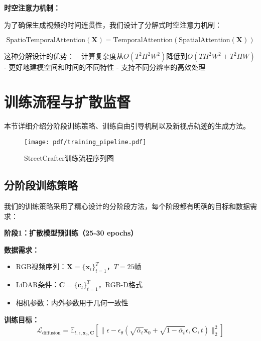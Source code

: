 \textbf{时空注意力机制：}

为了确保生成视频的时间连贯性，我们设计了分解式时空注意力机制：

\begin{equation}
\text{SpatioTemporalAttention}(\mathbf{X}) = \text{TemporalAttention}(\text{SpatialAttention}(\mathbf{X}))
\label{eq:factorized_attention}
\end{equation}

这种分解设计的优势：
- 计算复杂度从$O(T^2H^2W^2)$降低到$O(TH^2W^2 + T^2HW)$
- 更好地建模空间和时间的不同特性
- 支持不同分辨率的高效处理

\section{训练流程与扩散监督}

本节详细介绍分阶段训练策略、训练自由引导机制以及新视点轨迹的生成方法。

\begin{figure}[htbp]
  \centering
  \texttt{[image: pdf/training\_pipeline.pdf]}
  \caption{StreetCrafter训练流程序列图}
  \label{fig:training-pipeline}
\end{figure}

\subsection{分阶段训练策略}

我们的训练策略采用了精心设计的分阶段方法，每个阶段都有明确的目标和数据需求：

\textbf{阶段1：扩散模型预训练（25-30 epochs）}

\textbf{数据需求：}
\begin{itemize}
\item RGB视频序列：$\mathbf{X} = \{\mathbf{x}_t\}_{t=1}^{T}$，$T=25$帧
\item LiDAR条件：$\mathbf{C} = \{\mathbf{c}_t\}_{t=1}^{T}$，RGB-D格式
\item 相机参数：内外参数用于几何一致性
\end{itemize}

\textbf{训练目标：}
\begin{equation}
\mathcal{L}_{\text{diffusion}} = \mathbb{E}_{t,\epsilon,\mathbf{x}_0,\mathbf{C}} \left[ \|\epsilon - \epsilon_\theta(\sqrt{\bar{\alpha}_t} \mathbf{x}_0 + \sqrt{1-\bar{\alpha}_t} \epsilon, \mathbf{C}, t)\|_2^2 \right]
\label{eq:diffusion_pretraining}
\end{equation}

